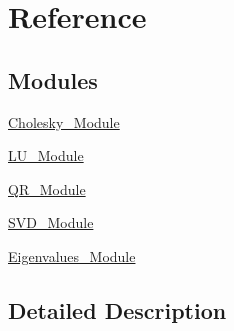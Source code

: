 \hypertarget{group___dense_linear_solvers___reference}{}\section{Reference}
\label{group___dense_linear_solvers___reference}
\subsection*{Modules}
\begin{DoxyCompactItemize}
\item 
\hyperlink{group___cholesky___module}{Cholesky\+\_\+\+Module}
\item 
\hyperlink{group___l_u___module}{L\+U\+\_\+\+Module}
\item 
\hyperlink{group___q_r___module}{Q\+R\+\_\+\+Module}
\item 
\hyperlink{group___s_v_d___module}{S\+V\+D\+\_\+\+Module}
\item 
\hyperlink{group___eigenvalues___module}{Eigenvalues\+\_\+\+Module}
\end{DoxyCompactItemize}


\subsection{Detailed Description}
